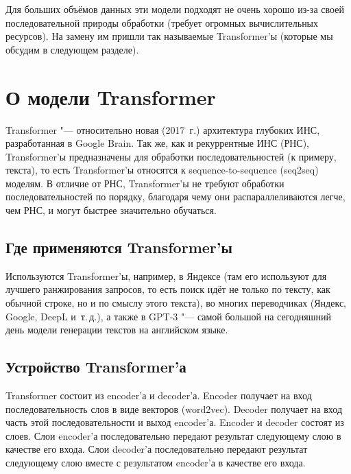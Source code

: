 Для больших объёмов данных эти модели подходят не очень хорошо из-за своей последовательной природы обработки (требует огромных вычислительных ресурсов). На замену им пришли так называемые Transformer'ы (которые мы обсудим в следующем разделе).


\section{О модели Transformer}


Transformer "--- относительно новая (2017~г.) архитектура глубоких ИНС, разработанная в Google Brain.
Так же, как и рекуррентные ИНС (РНС), Transformer'ы предназначены для обработки последовательностей (к примеру, текста), то есть Transformer'ы относятся к sequence-to-sequence (seq2seq) моделям. В отличие от РНС, Transformer'ы не требуют обработки последовательностей по порядку, благодаря чему они распараллеливаются легче, чем РНС, и могут быстрее значительно обучаться.


\subsection{Где применяются Transformer'ы}


Используются Transformer'ы, например, в Яндексе (там его используют для лучшего ранжирования запросов, то есть поиск идёт не только по тексту, как обычной строке, но и по смыслу этого текста), во многих переводчиках (Яндекс, Google, DeepL и~т.\,д.), а также в GPT-3 "--- самой большой на сегодняшний день модели генерации текстов на английском языке.


\subsection{Устройство Transformer'а}


Transformer состоит из encoder'а и decoder'а. Encoder получает на вход последовательность слов в виде векторов (word2vec). Decoder получает на вход часть этой последовательности и выход encoder'а. Encoder и decoder состоят из слоев. Слои encoder'а последовательно передают результат следующему слою в качестве его входа. Слои decoder'а последовательно передают результат следующему слою вместе с результатом encoder'а в качестве его входа.

